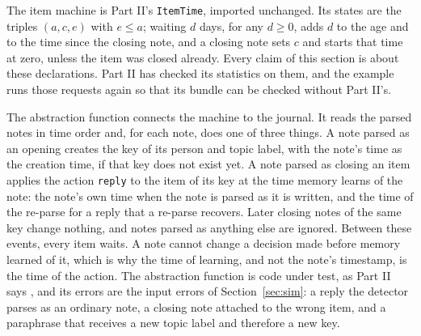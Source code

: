 \documentclass[11pt]{article}
\newcommand{\code}[1]{\texttt{#1}}
\theoremstyle{definition}
\theoremstyle{plain}
\begin{document}
The item machine is Part II's \code{ItemTime}, imported unchanged. Its states are the triples
$(a,c,e)$ with $e\le a$; waiting $d$ days, for any $d\ge 0$, adds $d$ to the age and to the time
since the closing note, and a closing note sets $c$ and starts that time at zero, unless the item
was closed already. Every claim of this section is about these declarations. Part II has checked
its statistics on them, and the example runs those requests again so that its bundle can be checked
without Part II's.

The abstraction function connects the machine to the journal. It reads the parsed notes in time
order and, for each note, does one of three things. A note parsed as an opening creates the key of
its person and topic label, with the note's time as the creation time, if that key does not exist
yet. A note parsed as closing an item applies the action \code{reply} to the item of its key at the
time memory learns of the note: the note's own time when the note is parsed as it is written, and the
time of the re-parse for a reply that a re-parse recovers. Later closing notes of the same key change
nothing, and notes parsed as anything else are ignored. Between these events, every item waits. A
note cannot change a decision made before memory learned of it, which is why the time of learning,
and not the note's timestamp, is the time of the action. The abstraction function is code under test, as Part II
says \cite[Section~8.3]{part2}, and its errors are the input errors of Section~\ref{sec:sim}: a
reply the detector parses as an ordinary note, a closing note attached to the wrong item, and a
paraphrase that receives a new topic label and therefore a new key.
\end{document}
